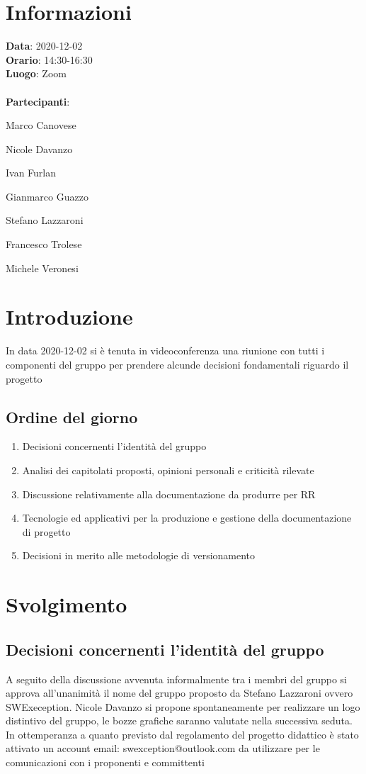 \section{Informazioni}
\textbf{Data}: 2020-12-02\\
\textbf{Orario}: 14:30-16:30\\
\textbf{Luogo}: Zoom\\\\
\textbf{Partecipanti}:\begin{list}{*}{\setlength{\itemsep}{0cm}}
	\item Marco Canovese
	\item Nicole Davanzo
	\item Ivan Furlan
	\item Gianmarco Guazzo
	\item Stefano Lazzaroni
	\item Francesco Trolese
	\item Michele Veronesi
\end{list}

\section{Introduzione}
In data 2020-12-02 si è tenuta in videoconferenza una riunione con tutti i componenti del gruppo per prendere alcunde decisioni fondamentali riguardo il progetto

\subsection{Ordine del giorno}
\begin{enumerate}
    \item Decisioni concernenti l'identità del gruppo
    \item Analisi dei capitolati proposti, opinioni personali e criticità rilevate
    \item Discussione relativamente alla documentazione da produrre per RR
    \item Tecnologie ed applicativi per la produzione e gestione della documentazione di progetto
    \item Decisioni in merito alle metodologie di versionamento
\end{enumerate}

\section{Svolgimento}

\subsection{Decisioni concernenti l'identità del gruppo}
A seguito della discussione avvenuta informalmente tra i membri del gruppo si approva all’unanimità il nome del gruppo proposto da Stefano Lazzaroni ovvero SWExeception. Nicole Davanzo si propone spontaneamente per realizzare un logo distintivo del gruppo, le bozze grafiche saranno valutate nella successiva seduta.
In ottemperanza a quanto previsto dal regolamento del progetto didattico è stato attivato un account email: swexception@outlook.com da utilizzare per le comunicazioni con i proponenti e committenti


